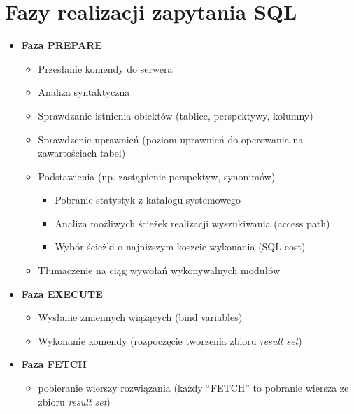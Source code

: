 \documentclass[a4paper,twoside]{article}
\begin{document}
  \part*{Fazy realizacji zapytania SQL}
      \begin{itemize}
      \item \textbf{Faza PREPARE}		%
          \begin{itemize}
          \item Przesłanie komendy do serwera
          \item Analiza syntaktyczna
          \item Sprawdzanie istnienia obiektów (tablice, perspektywy, kolumny)
          \item Sprawdzenie uprawnień (poziom uprawnień do operowania na zawartościach tabel)
          \item Podstawienia (np. zastąpienie perspektyw, synonimów)
              \begin{itemize}
              \item Pobranie statystyk z katalogu systemowego
              \item Analiza możliwych ścieżek realizacji wyszukiwania (access path)
              \item Wybór ścieżki o najniższym koszcie wykonania (SQL cost)
              \end{itemize}
          \item Tłumaczenie na ciąg wywołań wykonywalnych modułów
          \end{itemize}
      \item \textbf{Faza EXECUTE}		%
          \begin{itemize}
          \item Wysłanie zmiennych wiążących (bind variables)
          \item Wykonanie komendy (rozpoczęcie tworzenia zbioru \emph{result set})
          \end{itemize}
      \item \textbf{Faza FETCH}		%
          \begin{itemize}
          \item pobieranie wierszy rozwiązania (każdy “FETCH” to pobranie wiersza ze zbioru \emph{result set})
          \end{itemize}
      \end{itemize}


\end{document}
